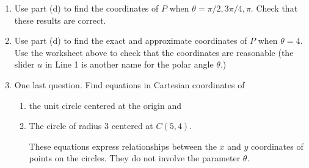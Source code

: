 \documentclass{ximera}
\begin{document}
\begin{question}
\begin{explanation}
\begin{enumerate}
\item Use part (d) to find the coordinates of $P$ when $\theta=\pi/2, 3\pi/4, \pi$. Check that these results are correct.

\item Use part (d) to find the exact and approximate coordinates of $P$ when $\theta =4$. Use the worksheet above to check that the coordinates are reasonable (the slider $u$ in Line 1 is another name for the polar angle $\theta$.) 


\item One last question. Find equations in Cartesian coordinates of 

\begin{enumerate}
\item the unit circle centered at the origin and 

\item The circle of radius $3$ centered at  $C(5,4)$.

These equations express relationships between the $x$ and $y$ coordinates of points on the circles. They do not involve the parameter $\theta$. 

\end{enumerate}
\end{enumerate}

\end{explanation}
\end{question}
\end{document}
